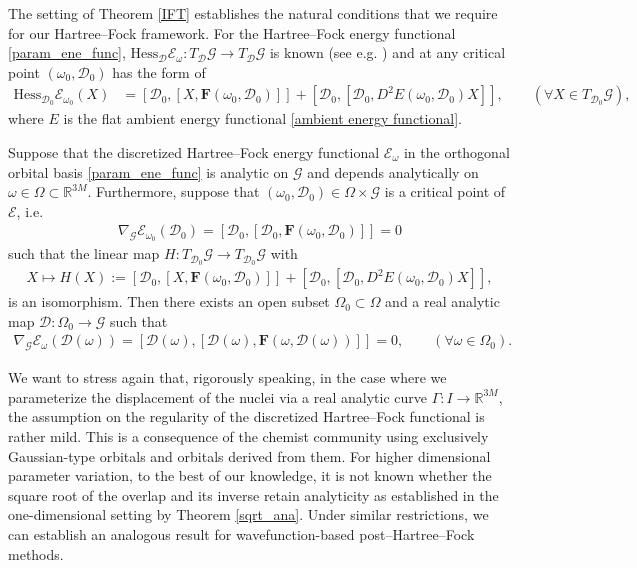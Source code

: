 \documentclass[reqno]{amsart}
\begin{document}
The setting of Theorem \ref{IFT} establishes the natural conditions that we require for our Hartree–Fock framework. For the Hartree–Fock energy functional \eqref{param_ene_func}, $\text{Hess}_{\mathscr{D}}\mathcal{E}_{\omega}:T_{\mathscr{D}}\mathcal{G}\longrightarrow T_{\mathscr{D}}\mathcal{G}$ is known (see e.g. \cite{laura, gasp}) and at any critical point $(\omega_0,\mathscr{D}_0)$ has the form of 
\begin{align}
    \text{Hess}_{\mathscr{D}_0}\mathcal{E}_{\omega_0}(X)&=[\mathscr{D}_0,[X,\mathbf{F}(\omega_0,\mathscr{D}_0)]]+[\mathscr{D}_0,[\mathscr{D}_0, D^2 E(\omega_0,\mathscr{D}_0)X]],\qquad(\forall X\in T_{\mathscr{D}_0}\mathcal{G}),
\end{align}
where $E$ is the flat ambient energy functional \eqref{ambient energy functional}. 
\begin{corollary}\label{HF_coroll}
Suppose that the discretized Hartree–Fock energy functional $\mathcal{E}_\omega$ in the orthogonal orbital basis \eqref{param_ene_func} is analytic on $\mathcal{G}$ and depends analytically on $\omega\in \Omega \subset \mathbb{R}^{3M}$. Furthermore, suppose that $(\omega_0,\mathscr{D}_0)\in \Omega \times \mathcal{G}$ is a critical point of $\mathcal{E}$, i.e.
\begin{align}
    \nabla_\mathcal{G}\mathcal{E}_{\omega_0}(\mathscr{D}_0)=[\mathscr{D}_0,[\mathscr{D}_0,\mathbf{F}(\omega_0,\mathscr{D}_0)]]=0
\end{align}
such that the linear map $H:T_{\mathscr{D}_0}\mathcal{G}\longrightarrow T_{\mathscr{D}_0}\mathcal{G}$ with 
\begin{align}
    X\mapsto H(X):=[\mathscr{D}_0,[X,\mathbf{F}(\omega_0,\mathscr{D}_0)]]+[\mathscr{D}_0,[\mathscr{D}_0, D^2E(\omega_0,\mathscr{D}_0)X]],
\end{align}
is an isomorphism. Then there exists an open subset $\Omega_0\subset \Omega$ and a real analytic map $\mathscr{D}:\Omega_0 \longrightarrow \mathcal{G}$ such that
\begin{align}
    \nabla_\mathcal{G}\mathcal{E}_{\omega}(\mathscr{D}(\omega))=[\mathscr{D}(\omega),[\mathscr{D}(\omega),\mathbf{F}(\omega,\mathscr{D}(\omega))]]=0, \qquad(\forall \omega\in \Omega_0).
\end{align}
\end{corollary}

We want to stress again that, rigorously speaking, in the case where we parameterize the displacement of the nuclei via a real analytic curve $\Gamma:I\longrightarrow\mathbb{R}^{3M}$, the assumption on the regularity of the discretized Hartree–Fock functional is rather mild. This is a consequence of the chemist community using exclusively Gaussian-type orbitals and orbitals derived from them. For higher dimensional parameter variation, to the best of our knowledge, it is not known whether the square root of the overlap and its inverse retain analyticity as established in the one-dimensional setting by Theorem \ref{sqrt_ana}. Under similar restrictions, we can establish an analogous result for wavefunction-based post–Hartree–Fock methods. 
\end{document}
